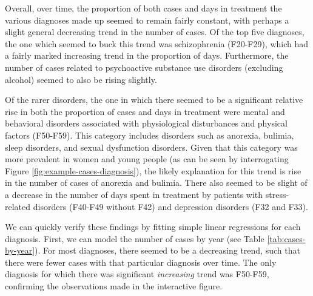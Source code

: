 \documentclass[
  openany]{book}
\theoremstyle{definition}
\theoremstyle{definition}
\theoremstyle{definition}
\theoremstyle{definition}
\theoremstyle{remark}
\begin{document}
Overall, over time, the proportion of both cases and days in treatment the various diagnoses made up seemed to remain fairly constant, with perhaps a slight general decreasing trend in the number of cases. Of the top five diagnoses, the one which seemed to buck this trend was schizophrenia (F20-F29), which had a fairly marked increasing trend in the proportion of days. Furthermore, the number of cases related to psychoactive substance use disorders (excluding alcohol) seemed to also be rising slightly.

Of the rarer disorders, the one in which there seemed to be a significant relative rise in both the proportion of cases and days in treatment were mental and behavioral disorders associated with physiological disturbances and physical factors (F50-F59). This category includes disorders such as anorexia, bulimia, sleep disorders, and sexual dysfunction disorders. Given that this category was more prevalent in women and young people (as can be seen by interrogating Figure \ref{fig:example-cases-diagnosis}), the likely explanation for this trend is rise in the number of cases of anorexia and bulimia. There also seemed to be slight of a decrease in the number of days spent in treatment by patients with stress-related disorders (F40-F49 without F42) and depression disorders (F32 and F33).

We can quickly verify these findings by fitting simple linear regressions for each diagnosis. First, we can model the number of cases by year (see Table \ref{tab:cases-by-year}). For most diagnoses, there seemed to be a decreasing trend, such that there were fewer cases with that particular diagnosis over time. The only diagnosis for which there was significant \emph{increasing} trend was F50-F59, confirming the observations made in the interactive figure.
\end{document}
